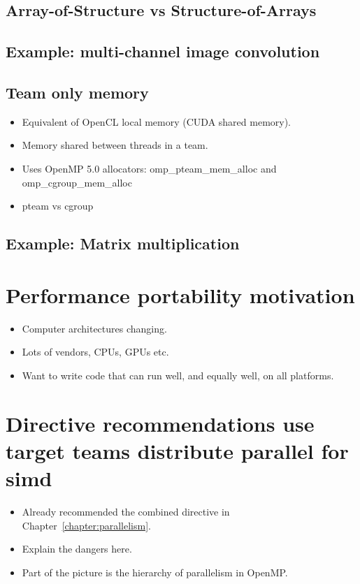 \subsection{Array-of-Structure vs Structure-of-Arrays}
\subsection{Example: multi-channel image convolution}

\subsection{Team only memory}
\label{sec:team_only_memory}
\begin{itemize}
  \item Equivalent of OpenCL local memory (CUDA shared memory).
  \item Memory shared between threads in a team.
  \item Uses OpenMP 5.0 allocators: omp\_pteam\_mem\_alloc and omp\_cgroup\_mem\_alloc
  \item pteam vs cgroup
\end{itemize}
\subsection{Example: Matrix multiplication}

\section{Performance portability motivation}
\begin{itemize}
  \item Computer architectures changing.
  \item Lots of vendors, CPUs, GPUs etc.
  \item Want to write code that can run well, and equally well, on all platforms.
\end{itemize}


\section{Directive recommendations use target teams distribute parallel for simd}
\begin{itemize}
  \item Already recommended the combined directive in Chapter~\ref{chapter:parallelism}.
  \item Explain the dangers here.
  \item Part of the picture is the hierarchy of parallelism in OpenMP.
\end{itemize}

